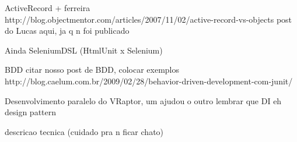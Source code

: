 ActiveRecord + ferreira
http://blog.objectmentor.com/articles/2007/11/02/active-record-vs-objects
post do Lucas aqui, ja q n foi publicado

Ainda SeleniumDSL (HtmlUnit x Selenium)

BDD
citar nosso post de BDD, colocar exemplos
http://blog.caelum.com.br/2009/02/28/behavior-driven-development-com-junit/

Desenvolvimento paralelo do VRaptor, um ajudou o outro
lembrar que DI eh design pattern

descricao tecnica (cuidado pra n ficar chato)


